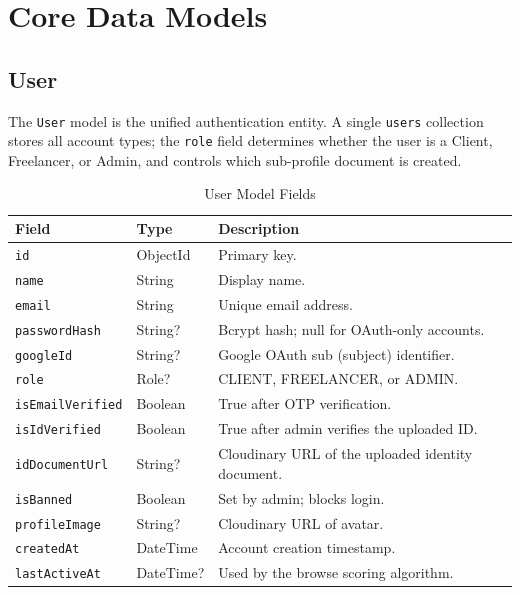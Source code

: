 \section{Core Data Models}

\subsection{User}

The \texttt{User} model is the unified authentication entity. A single \texttt{users} collection stores all account types; the \texttt{role} field determines whether the user is a Client, Freelancer, or Admin, and controls which sub-profile document is created.

\begin{table}[H]
\centering
\caption{User Model Fields}
\begin{tabularx}{\textwidth}{llX}
\toprule
\textbf{Field} & \textbf{Type} & \textbf{Description} \\
\midrule
\texttt{id}               & ObjectId & Primary key. \\
\texttt{name}             & String   & Display name. \\
\texttt{email}            & String   & Unique email address. \\
\texttt{passwordHash}     & String?  & Bcrypt hash; null for OAuth-only accounts. \\
\texttt{googleId}         & String?  & Google OAuth sub (subject) identifier. \\
\texttt{role}             & Role?    & CLIENT, FREELANCER, or ADMIN. \\
\texttt{isEmailVerified}  & Boolean  & True after OTP verification. \\
\texttt{isIdVerified}     & Boolean  & True after admin verifies the uploaded ID. \\
\texttt{idDocumentUrl}    & String?  & Cloudinary URL of the uploaded identity document. \\
\texttt{isBanned}         & Boolean  & Set by admin; blocks login. \\
\texttt{profileImage}     & String?  & Cloudinary URL of avatar. \\
\texttt{createdAt}        & DateTime & Account creation timestamp. \\
\texttt{lastActiveAt}     & DateTime? & Used by the browse scoring algorithm. \\
\bottomrule
\end{tabularx}
\end{table}

